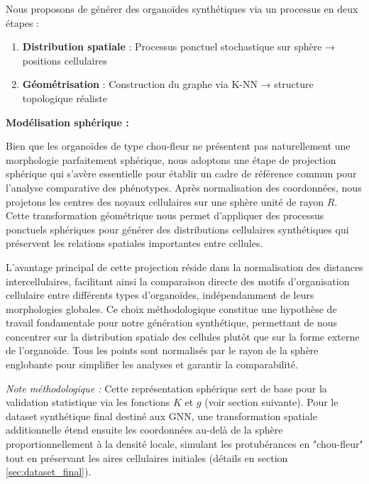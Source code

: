 Nous proposons de générer des organoïdes synthétiques via un processus en deux étapes :
\begin{enumerate}
    \item \textbf{Distribution spatiale} : Processus ponctuel stochastique sur sphère → positions cellulaires
    \item \textbf{Géométrisation} : Construction du graphe via K-NN → structure topologique réaliste
\end{enumerate}

\textbf{Modélisation sphérique :}

Bien que les organoïdes de type chou-fleur ne présentent pas naturellement une morphologie parfaitement sphérique, nous adoptons une étape de projection sphérique qui s'avère essentielle pour établir un cadre de référence commun pour l'analyse comparative des phénotypes. Après normalisation des coordonnées, nous projetons les centres des noyaux cellulaires sur une sphère unité de rayon $R$. Cette transformation géométrique nous permet d'appliquer des processus ponctuels sphériques pour générer des distributions cellulaires synthétiques qui préservent les relations spatiales importantes entre cellules.

L'avantage principal de cette projection réside dans la normalisation des distances intercellulaires, facilitant ainsi la comparaison directe des motifs d'organisation cellulaire entre différents types d'organoïdes, indépendamment de leurs morphologies globales. Ce choix méthodologique constitue une hypothèse de travail fondamentale pour notre génération synthétique, permettant de nous concentrer sur la distribution spatiale des cellules plutôt que sur la forme externe de l'organoïde. Tous les points sont normalisés par le rayon de la sphère englobante pour simplifier les analyses et garantir la comparabilité.

\textit{Note méthodologique :} Cette représentation sphérique sert de base pour la validation statistique via les fonctions $K$ et $g$ (voir section suivante). Pour le dataset synthétique final destiné aux GNN, une transformation spatiale additionnelle étend ensuite les coordonnées au-delà de la sphère proportionnellement à la densité locale, simulant les protubérances en "chou-fleur" tout en préservant les aires cellulaires initiales (détails en section \ref{sec:dataset_final}).


